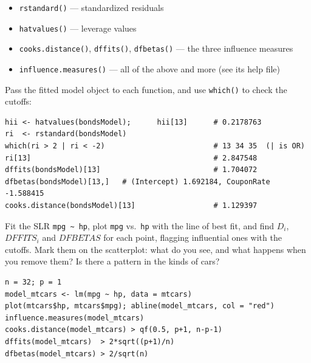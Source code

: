 \begin{itemize}
    \item \texttt{rstandard()} --- standardized residuals
    \item \texttt{hatvalues()} --- leverage values
    \item \texttt{cooks.distance()}, \texttt{dffits()}, \texttt{dfbetas()} --- the three influence measures
    \item \texttt{influence.measures()} --- all of the above and more (see its help file)
\end{itemize}

\begin{example}
    Pass the fitted model object to each function, and use \texttt{which()} to check the cutoffs:
\begin{verbatim}
hii <- hatvalues(bondsModel);      hii[13]      # 0.2178763
ri  <- rstandard(bondsModel)
which(ri > 2 | ri < -2)                         # 13 34 35  (| is OR)
ri[13]                                          # 2.847548
dffits(bondsModel)[13]                          # 1.704072
dfbetas(bondsModel)[13,]   # (Intercept) 1.692184, CouponRate -1.588415
cooks.distance(bondsModel)[13]                  # 1.129397
\end{verbatim}
\end{example}

\begin{exercise}
    Fit the SLR \texttt{mpg \textasciitilde{} hp}, plot \texttt{mpg} vs.\ \texttt{hp} with the line of
    best fit, and find $D_i$, $DFFITS_i$ and $DFBETAS$ for each point, flagging influential ones
    with the cutoffs. Mark them on the scatterplot: what do you see, and what happens when you
    remove them? Is there a pattern in the kinds of cars?
\begin{verbatim}
n = 32; p = 1
model_mtcars <- lm(mpg ~ hp, data = mtcars)
plot(mtcars$hp, mtcars$mpg); abline(model_mtcars, col = "red")
influence.measures(model_mtcars)
cooks.distance(model_mtcars) > qf(0.5, p+1, n-p-1)
dffits(model_mtcars)  > 2*sqrt((p+1)/n)
dfbetas(model_mtcars) > 2/sqrt(n)
\end{verbatim}
\end{exercise}

